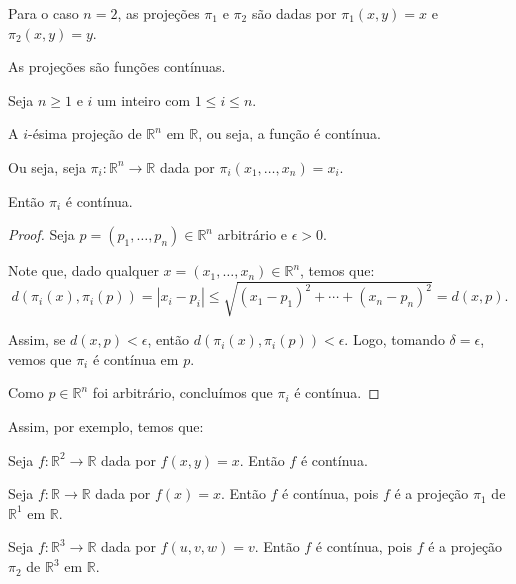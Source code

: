 \begin{example}
    Para o caso $n=2$, as projeções $\pi_1$ e $\pi_2$ são dadas por $\pi_1(x, y) = x$ e $\pi_2(x, y) = y$.
\end{example}

As projeções são funções contínuas.
\begin{proposition}
    Seja $n\geq 1$ e $i$ um inteiro com $1\leq i\leq n$.
    
    A $i$-ésima projeção de $\mathbb R^n$ em $\mathbb R$, ou seja, a função é contínua.
    
    Ou seja, seja $\pi_i: \mathbb R^n\rightarrow \mathbb R$ dada por $\pi_i(x_1, \dots, x_n) = x_i$.

    Então $\pi_i$ é contínua.
\end{proposition}
\begin{proof}
    Seja $p=(p_1, \dots, p_n) \in \mathbb R^n$ arbitrário e $\epsilon>0$.

    Note que, dado qualquer $x=(x_1, \dots, x_n) \in \mathbb R^n$, temos que:
    \begin{equation*}
        d(\pi_i(x), \pi_i(p)) = |x_i - p_i| \leq \sqrt{(x_1 - p_1)^2 + \cdots + (x_n - p_n)^2} = d(x, p).
    \end{equation*}

    Assim, se $d(x, p)<\epsilon$, então $d(\pi_i(x), \pi_i(p))<\epsilon$.
    Logo, tomando $\delta=\epsilon$, vemos que $\pi_i$ é contínua em $p$.

    Como $p\in \mathbb R^n$ foi arbitrário, concluímos que $\pi_i$ é contínua.
\end{proof}

Assim, por exemplo, temos que:

\begin{example}
    Seja $f: \mathbb R^2\rightarrow \mathbb R$ dada por $f(x, y) = x$.
    Então $f$ é contínua.
\end{example}

\begin{example}
    Seja $f: \mathbb R\rightarrow \mathbb R$ dada por $f(x) = x$.
    Então $f$ é contínua, pois $f$ é a projeção $\pi_1$ de $\mathbb R^1$ em $\mathbb R$.
\end{example}

\begin{example}
    Seja $f: \mathbb R^3\rightarrow \mathbb R$ dada por $f(u, v, w)=v$.
    Então $f$ é contínua, pois $f$ é a projeção $\pi_2$ de $\mathbb R^3$ em $\mathbb R$.
\end{example}


